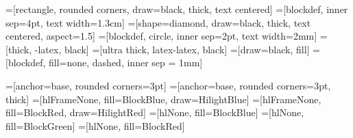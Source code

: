 \usetikzlibrary{topaths}
\usetikzlibrary{decorations.pathmorphing}
\usetikzlibrary{fit}
\usetikzlibrary{shapes.geometric}
\usetikzlibrary{backgrounds}	%
\usetikzlibrary{arrows}
\usetikzlibrary{matrix,calc} %
\usetikzlibrary{patterns}

\newcommand{\RA}{\tikz[baseline=0mm]  \draw[ultra thick, -stealth] (0,1.3mm)--(3.5mm,1.3mm); }
\newcommand{\VA}{\tikz[baseline=0mm]  \draw[ultra thick, -stealth] (0,0mm)--(0mm,-3.5mm); }
\newcommand{\VUA}{\tikz[baseline=0mm]  \draw[ultra thick, -stealth] (0,0mm)--(0mm,3.5mm); }
\newcommand{\DA}{\tikz[baseline=0mm]  \draw[ultra thick, stealth-stealth] (0,1.3mm)--(5.5mm,1.3mm); }

\newcommand{\coordcross}[6]{%
	\draw[->, >=latex] (#1,0) -- (#2,0) node[right,below] {#5};
  \draw[->, >=latex] (0,#3) -- (0,#4) node[left] {#6};
}


=[rectangle, rounded corners, draw=black, thick, text centered]
=[blockdef, inner sep=4pt, text width=1.3cm]
=[shape=diamond, draw=black, thick, text centered, aspect=1.5]
=[blockdef, circle, inner sep=2pt, text width=2mm]
=[thick, -latex, black]
=[ultra thick, latex-latex, black]
=[draw=black, fill]
=[blockdef, fill=none, dashed, inner sep = 1mm]


=[anchor=base, rounded corners=3pt]
=[anchor=base, rounded corners=3pt, thick]
=[hlFrameNone, fill=BlockBlue, draw=HilightBlue]
=[hlFrameNone, fill=BlockRed, draw=HilightRed]
=[hlNone, fill=BlockBlue]
=[hlNone, fill=BlockGreen]
=[hlNone, fill=BlockRed]

\everymath{\displaystyle}
